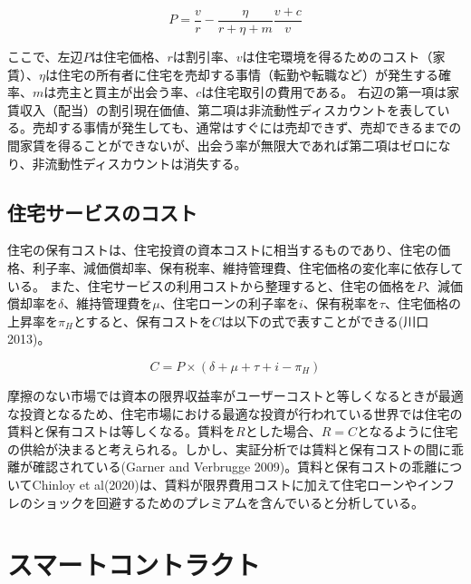 \documentclass[a4paper,fontsize=11pt,report,notitlepage,line_length=38zw,number_of_lines=40,dvipdfmx]{jlreq}
\begin{document}
\begin{equation}
P=\dfrac{v}{r}-\dfrac{\eta}{r+\eta+m}\dfrac{v+c}{v}
\end{equation}

ここで、左辺$P$は住宅価格、$r$は割引率、$v$は住宅環境を得るためのコスト（家賃）、$\eta$は住宅の所有者に住宅を売却する事情（転勤や転職など）が発生する確率、$m$は売主と買主が出会う率、$c$は住宅取引の費用である。
右辺の第一項は家賃収入（配当）の割引現在価値、第二項は非流動性ディスカウントを表している。売却する事情が発生しても、通常はすぐには売却できず、売却できるまでの間家賃を得ることができないが、出会う率が無限大であれば第二項はゼロになり、非流動性ディスカウントは消失する。

\subsection{住宅サービスのコスト}
住宅の保有コストは、住宅投資の資本コストに相当するものであり、住宅の価格、利子率、減価償却率、保有税率、維持管理費、住宅価格の変化率に依存している。
また、住宅サービスの利用コストから整理すると、住宅の価格を$P$、減価償却率を$\delta$、維持管理費を$\mu$、住宅ローンの利子率を$i$、保有税率を$\tau$、住宅価格の上昇率を$\pi_H$とすると、保有コストを$C$は以下の式で表すことができる(川口 2013)\cite{kawaguchi2013}。

\begin{equation}
C=P\times(\delta+\mu+\tau+i-\pi_H)
\end{equation}

摩擦のない市場では資本の限界収益率がユーザーコストと等しくなるときが最適な投資となるため、住宅市場における最適な投資が行われている世界では住宅の賃料と保有コストは等しくなる。賃料を$R$とした場合、$R=C$となるように住宅の供給が決まると考えられる。しかし、実証分析では賃料と保有コストの間に乖離が確認されている(Garner and Verbrugge 2009)\cite{garner2009}。賃料と保有コストの乖離についてChinloy et al(2020)\cite{chinloy2020}は、賃料が限界費用コストに加えて住宅ローンやインフレのショックを回避するためのプレミアムを含んでいると分析している。

\section{スマートコントラクト}
\end{document}

